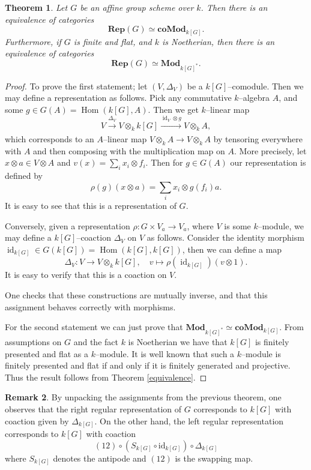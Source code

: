 \documentclass{article}
\theoremstyle{plain}
\newtheorem{Th}{Theorem}[section]
\theoremstyle{definition}
\newtheorem{Rem}[Th]{Remark}
\DeclareMathOperator{\id}{id}
\DeclareMathOperator{\Hom}{Hom}
\begin{document}
\begin{Th}\label{comodules}
    Let $G$ be an affine group scheme over $k$. Then there is an equivalence of categories 
    \[
    \mathbf{Rep}(G) \simeq \mathbf{coMod}_{k[G]}.
    \]
    Furthermore, if $G$ is finite and flat, and $k$ is Noetherian, then there is an equivalence of categories 
    \[
    \mathbf{Rep}(G) \simeq \mathbf{Mod}_{k[G]^*}. 
    \]
\end{Th}



\begin{proof}
    To prove the first statement; let $(V, \Delta_V)$ be a $k[G]$--comodule. Then we may define a representation as follows. Pick any commutative $k$--algebra $A$, and some $g\in G(A)=\Hom(k[G], A)$. Then we get  $k$--linear map 
    \[
    V\xrightarrow[]{\Delta_V} V\otimes_k k[G] \xrightarrow[]{\id_V\otimes g} V\otimes_k A,
    \]
    which corresponds to an $A$--linear map $V\otimes_k A\to V\otimes_k A$ by tensoring everywhere with $A$ and then composing with the multiplication map on $A$. More precisely, let $x\otimes a \in V\otimes A$ and $v(x)=\sum_i x_i\otimes f_i$. Then for $g\in G(A)$ our representation is defined by 
    \[
    \rho(g)(x\otimes a)=\sum_i x_i \otimes g(f_i)a. 
    \]
     It is easy to see that this is a representation of $G$.

    Conversely, given a representation $\rho\colon G\times V_a\to V_a$, where $V$ is some $k$--module, we may define a $k[G]$--coaction $\Delta_V$ on $V$ as follows. Consider the identity morphism $\id_{k[G]} \in G(k[G])=\Hom(k[G], k[G])$, then we can define a map
    \[
    \Delta_V\colon V \to V\otimes_k k[G], \quad v\mapsto \rho(\id_{k[G]})(v\otimes 1).
    \]
      It is easy to verify that  this is a coaction on $V$.

    One checks that these constructions are mutually inverse, and that this assignment behaves correctly with morphisms. 

    For the second statement we can just prove that $\textbf{Mod}_{k[G]^\ast}\simeq \mathbf{coMod}_{k[G]}$. From assumptions on $G$ and the fact $k$ is Noetherian we have that $k[G]$ is finitely presented and flat as a $k$--module. It is well known that such a $k$--module is finitely presented and flat if and only if it is finitely generated and projective. Thus the result follows from Theorem \ref{equivalence}. 
\end{proof}


\begin{Rem}
   By unpacking the assignments from the previous theorem, one observes that the right regular representation of  $G$ corresponds to $k[G]$ with coaction given by $\Delta_{k[G]}$. On the other hand, the left regular representation corresponds to $k[G]$ with coaction 
   \[
   (12)\circ(S_{k[G]} \circ \mathrm{id}_{k[G]})\circ \Delta_{k[G]}
   \]
    where $S_{k[G]}$ denotes the antipode and $(12)$ is the swapping map.  
\end{Rem}
\end{document}
